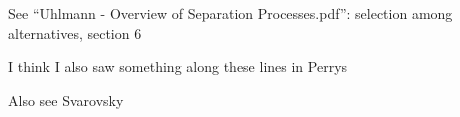 
See ``Uhlmann - Overview of Separation Processes.pdf'': selection among alternatives, section 6

I think I also saw something along these lines in Perrys

Also see Svarovsky